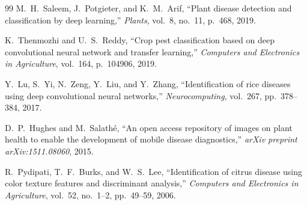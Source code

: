 \begin{thebibliography}{99}
M.\ H.\ Saleem, J.\ Potgieter, and K.\ M.\ Arif,
``Plant disease detection and classification by deep learning,''
\textit{Plants}, vol.\ 8, no.\ 11, p.\ 468, 2019.

K.\ Thenmozhi and U.\ S.\ Reddy,
``Crop pest classification based on deep convolutional neural network and
transfer learning,''
\textit{Computers and Electronics in Agriculture}, vol.\ 164, p.\ 104906,
2019.

Y.\ Lu, S.\ Yi, N.\ Zeng, Y.\ Liu, and Y.\ Zhang,
``Identification of rice diseases using deep convolutional neural networks,''
\textit{Neurocomputing}, vol.\ 267, pp.\ 378--384, 2017.

D.\ P.\ Hughes and M.\ Salathé,
``An open access repository of images on plant health to enable the
development of mobile disease diagnostics,''
\textit{arXiv preprint arXiv:1511.08060}, 2015.

R.\ Pydipati, T.\ F.\ Burks, and W.\ S.\ Lee,
``Identification of citrus disease using color texture features and
discriminant analysis,''
\textit{Computers and Electronics in Agriculture}, vol.\ 52, no.\ 1--2,
pp.\ 49--59, 2006.

\end{thebibliography}
